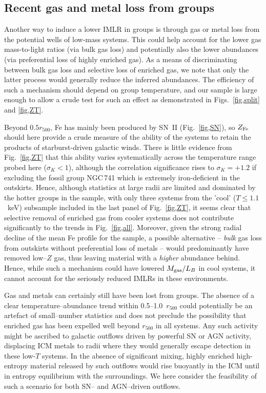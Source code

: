 \documentclass[useAMS,usenatbib]{mn2e}
\begin{document}
\subsection{Recent gas and metal loss from groups}\label{sec,gasloss}

Another way to induce a lower IMLR in groups is through gas or metal
loss from the potential wells of low-mass systems. This could help
account for the lower gas mass-to-light ratios (via bulk gas loss) and
potentially also the lower abundances (via preferential loss of highly
enriched gas). As a means of discriminating between bulk gas loss and
selective loss of enriched gas, we note that only the latter process
would generally reduce the inferred abundances. The efficiency of such
a mechanism should depend on group temperature, and our sample is
large enough to allow a crude test for such an effect as demonstrated
in Figs.~\ref{fig,split} and \ref{fig,ZT}.


Beyond $0.5r_{500}$, Fe has mainly been produced by SN~II
(Fig.~\ref{fig,SN}), so $Z_{\rm Fe}$ should here provide a crude
measure of the ability of the systems to retain the products of
starburst-driven galactic winds. There is little evidence from
Fig.~\ref{fig,ZT} that this ability varies systematically across the
temperature range probed here ($\sigma_K < 1$), although the
correlation significance rises to $\sigma_K=+1.2$ if excluding the
fossil group NGC\,741 which is extremely iron-deficient in the
outskirts. Hence, although statistics at large radii are limited and
dominated by the hotter groups in the sample, with only three systems
from the 'cool' ($T\le 1.1$~keV) subsample included in the last panel
of Fig.~\ref{fig,ZT}, it seems clear that selective removal of
enriched gas from cooler systems does not contribute significantly to
the trends in Fig.~\ref{fig,all}. Moreover, given the strong radial
decline of the mean Fe profile for the sample, a possible alternative
-- {\em bulk} gas loss from outskirts without preferential loss of
metals -- would predominantly have removed low--$Z$ gas, thus leaving
material with a {\em higher} abundance behind. Hence, while such a
mechanism could have lowered $M_{\rm gas}/L_B$ in cool systems, it
cannot account for the seriously reduced IMLRs in these environments.

Gas and metals can certainly still have been lost from groups. The
absence of a clear temperature--abundance trend within
0.5--1.0~$r_{500}$ could potentially be an artefact of small--number
statistics and does not preclude the possibility that enriched gas has
been expelled well beyond $r_{500}$ in all systems.  Any such activity
might be ascribed to galactic outflows driven by powerful SN or AGN
activity, displacing ICM metals to radii where they would generally
escape detection in these low-$T$ systems. In the absence of
significant mixing, highly enriched high-entropy material released by
such outflows would rise buoyantly in the ICM until in entropy
equilibrium with the surroundings. We here consider the feasibility of
such a scenario for both SN-- and AGN--driven outflows.
\end{document}
